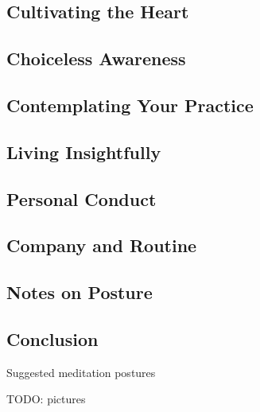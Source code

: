 \documentclass[10pt,twoside,final]{memoir}
\begin{document}
\newpage

\subsection{Cultivating the Heart}


\newpage


\subsection{Choiceless Awareness}


\newpage

\subsection{Contemplating Your Practice}


\newpage

\subsection{Living Insightfully}


\newpage


\subsection{Personal Conduct}


\newpage

\subsection{Company and Routine}


\newpage

\subsection{Notes on Posture}


\newpage

\subsection{Conclusion}



\backmatter

\cleartorecto
{\centering
\subSectionFont
Suggested meditation postures
\par}

TODO: pictures
%


\cleartorecto


\emptysheet
\end{document}
